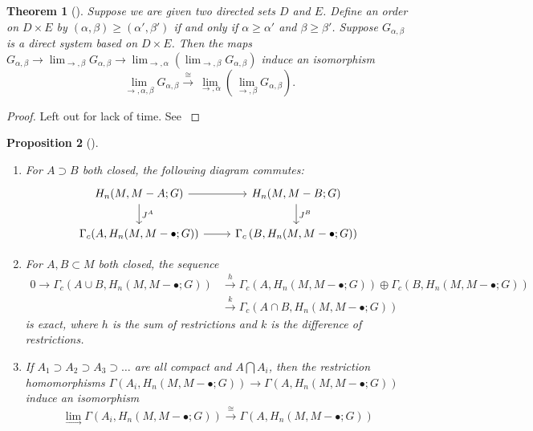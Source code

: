 \documentclass[reqno]{amsart}
\newtheorem{theorem}{Theorem}[section]
\newtheorem{proposition}[theorem]{Proposition}
\theoremstyle{definition}
\theoremstyle{remark}
\begin{document}
\begin{theorem}[]
    Suppose we are given two directed sets
    $D$ and $E$. Define an order on
    $D \times E$ by 
    $\left( \alpha, \beta \right) \ge 
    \left( \alpha', \beta' \right) $ if and only if
    $\alpha \ge \alpha'$ and
    $\beta \ge  \beta'$. Suppose
    $G_{\alpha, \beta}$ is a direct system
    based on $D \times E$. Then the maps
    $G_{\alpha,\beta} \to 
    \lim_{\rightarrow, \beta} G_{\alpha, \beta}
    \to \lim_{\rightarrow, \alpha}
    \left( \lim_{\rightarrow, \beta} G_{\alpha,\beta} \right) $
    induce an isomorphism
    \[
    \lim_{\rightarrow, \alpha,\beta} G_{\alpha, \beta}
    \stackrel{\cong}{\to} 
    \lim_{\rightarrow, \alpha} \left( 
    \lim_{\rightarrow, \beta} 
G_{\alpha, \beta}\right) .
    \]  
\end{theorem}

\begin{proof}
    Left out for lack of time. See \cite[Theorem D.5]{Bredon}
\end{proof}

\begin{proposition}[]\label{Prop:SIDJOXOLLWQU}
    \begin{enumerate}
        \item 
    For $A \supset B$ both closed, the following
    diagram commutes:
    \begin{equation*}
    \begin{tikzcd}
        H_n(M, M - A;G) \ar[r] \ar[d, "J^{A}"] &
        H_n(M, M - B ; G) \ar[d, "J^{B}"] \\
        \Gamma_c (A,
        H_n(M, M - \bullet ; G)) \ar[r] & 
        \Gamma_c \left( B,
        H_n(M, M - \bullet; G) \right) 
    \end{tikzcd}
    \end{equation*}
\item  For $A , B \subset M$ both closed, the sequence
        \begin{align*}
    0 \to \Gamma_c (A \cup B, 
    H_n(M, M - \bullet;G)) 
    &\stackrel{h}{\to} 
    \Gamma_c \left( A, H_n(M, M - \bullet;G) \right) 
    \oplus \Gamma_c \left( 
    B, H_n(M, M - \bullet; G) \right)\\
    &\stackrel{k}{\to} 
    \Gamma_c \left( A \cap B,
    H_n\left( M, M-\bullet; G \right) \right) 
        \end{align*}
    is exact, where $h$ is the sum of restrictions and
    $k$ is the difference of restrictions.
\item If $A_1 \supset A_2 \supset A_3 \supset \ldots$ are
    all compact and $A \bigcap A_i  $, then the restriction
    homomorphisms
    $\Gamma \left( A_i, H_n \left( M, M - \bullet; G \right)  \right) 
    \to \Gamma \left( A, H_n \left( M, M- \bullet; G \right) 
    \right) $ induce an isomorphism
    \[
    \lim_{\rightarrow} \Gamma
    \left( A_i, H_n\left( M, M - \bullet;G \right)  \right) 
    \stackrel{\cong}{\to} 
    \Gamma \left( A, H_n (M, M- \bullet;G) \right) 
    \] 
    \end{enumerate}
\end{proposition}
\end{document}
